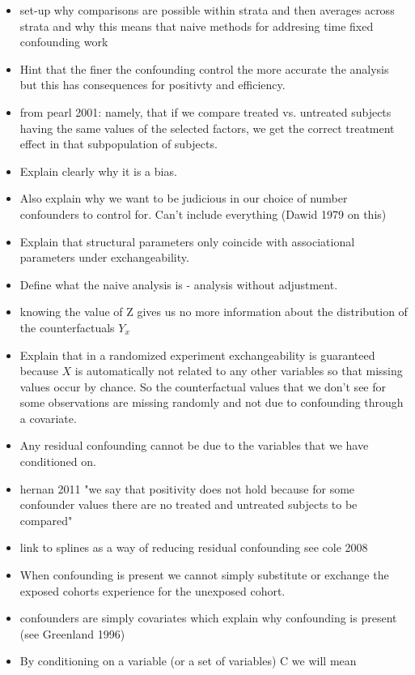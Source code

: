 \documentclass[11pt]{article}
\providecommand{\tightlist}{%
      \setlength{\itemsep}{0pt}\setlength{\parskip}{0pt}}
\begin{document}
\begin{itemize}
\tightlist
\item
  set-up why comparisons are possible within strata and then averages
  across strata and why this means that naive methods for addresing time
  fixed confounding work
\item
  Hint that the finer the confounding control the more accurate the
  analysis but this has consequences for positivty and efficiency.
\item
  from pearl 2001: namely, that if we compare treated vs. untreated
  subjects having the same values of the selected factors, we get the
  correct treatment effect in that subpopulation of subjects.
\item
  Explain clearly why it is a bias.
\item
  Also explain why we want to be judicious in our choice of number
  confounders to control for. Can't include everything (Dawid 1979 on
  this)
\item
  Explain that structural parameters only coincide with associational
  parameters under exchangeability.
\item
  Define what the naive analysis is - analysis without adjustment.
\item
  knowing the value of Z gives us no more information about the
  distribution of the counterfactuals \(Y_x\)
\item
  Explain that in a randomized experiment exchangeability is guaranteed
  because \(X\) is automatically not related to any other variables so
  that missing values occur by chance. So the counterfactual values that
  we don't see for some observations are missing randomly and not due to
  confounding through a covariate.
\item
  Any residual confounding cannot be due to the variables that we have
  conditioned on.
\item
  hernan 2011 "we say that positivity does not hold because for some
  confounder values there are no treated and untreated subjects to be
  compared"
\item
  link to splines as a way of reducing residual confounding see cole
  2008
\item
  When confounding is present we cannot simply substitute or exchange
  the exposed cohorts experience for the unexposed cohort.
\item
  confounders are simply covariates which explain why confounding is
  present (see Greenland 1996)
\item
  By conditioning on a variable (or a set of variables) C we will mean

\end{itemize}
\end{document}
